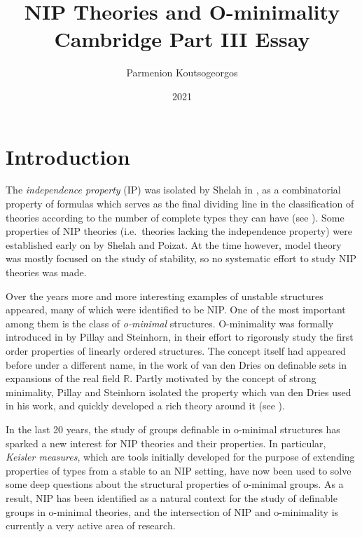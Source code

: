 \documentclass[a4paper]{report}
\newcommand{\ind}{\hspace{15pt}}
\newcommand{\R}{\mathbb{R}}
\theoremstyle{definition}
\theoremstyle{remstyle}
\newcommand{\uchapter}[1]{%
	\chapter*{#1}%
	\markboth{#1}{}%
	\addcontentsline{toc}{chapter}{#1}%
}
\begin{document}
\title{NIP Theories and O-minimality \\ \vspace{+8pt} \large Cambridge Part III Essay}
\author{Parmenion Koutsogeorgos}
\date{2021}

\maketitle

\vspace{+16pt}

\tableofcontents

\newpage


\uchapter{Introduction}

\ind The \emph{independence property} (IP) was isolated by Shelah in \cite{nip og}, as a combinatorial property of formulas which serves as the final dividing line in the classification of theories according to the number of complete types they can have (see \cite{stability function, six classes}). Some properties of NIP theories (i.e.\ theories lacking the independence property) were established early on by Shelah and Poizat. At the time however, model theory was mostly focused on the study of stability, so no systematic effort to study NIP theories was made.

\ind Over the years more and more interesting examples of unstable structures appeared, many of which were identified to be NIP. One of the most important among them is the class of \emph{o-minimal} structures. O-minimality was formally introduced in \cite{defI} by Pillay and Steinhorn, in their effort to rigorously study the first order properties of linearly ordered structures. The concept itself had appeared before under a different name, in the work of van den Dries on definable sets in expansions of the real field $\R$. Partly motivated by the concept of strong minimality, Pillay and Steinhorn isolated the property which van den Dries used in his work, and quickly developed a rich theory around it (see \cite{defI,defII,discrete,defIII}).

\ind In the last 20 years, the study of groups definable in o-minimal structures has sparked a new interest for NIP theories and their properties. In particular, \emph{Keisler measures}, which are tools initially developed for the purpose of extending properties of types from a stable to an NIP setting, have now been used to solve some deep questions about the structural properties of o-minimal groups. As a result, NIP has been identified as a natural context for the study of definable groups in o-minimal theories, and the intersection of NIP and o-minimality is currently a very active area of research.
\end{document}
